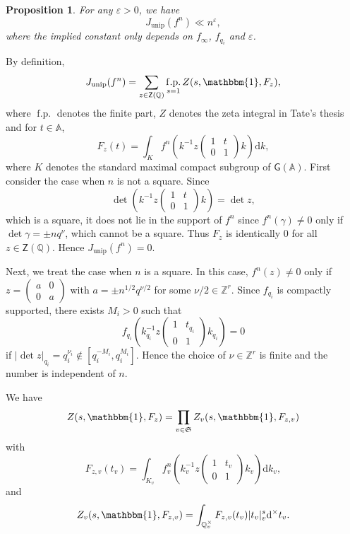\documentclass[10pt,oneside,reqno]{amsart}
\makeatletter
\newcommand\rmd{\mathrm{d}}
\renewcommand\AA{\mathbb{A}}
\newcommand\QQ{\mathbb{Q}}
\newcommand\ZZ{\mathbb{Z}}
\newcommand\mf[1]{\mathfrak{#1}}
\newcommand\G{\mathsf{G}}
\newcommand\Z{\mathsf{Z}}
\newcommand\triv{\mathbbm{1}}
\DeclareMathOperator\fp{f.p.}
\theoremstyle{THEOREM}
\newtheorem{proposition}[theorem]{Proposition}
\theoremstyle{DEFINITION}
\theoremstyle{EXERCISE}
\numberwithin{equation}{section}
\renewenvironment{proof}[1][\proofname]{\par
  \vspace{-6pt}
  \pushQED{\qed}
  \normalfont \topsep6\p@\@plus6\p@\relax
  \trivlist
  \item[\hskip\labelsep\rmfamily\bfseries
    #1\@addpunct{:}]\ignorespaces
}{
  \popQED\endtrivlist\@endpefalse
  \vspace{-6pt}
}
\makeatother
\begin{document}
\begin{proposition}\label{prop:unipestimate}
For any $\varepsilon>0$, we have
\[
J_\mathrm{unip}(f^n)\ll n^\varepsilon,
\]
where the implied constant only depends on $f_\infty$, $f_{q_i}$ and $\varepsilon$.
\end{proposition}
\begin{proof}
By definition, 
\[
J_\mathrm{unip}(f^n)=\sum_{z\in \Z(\QQ)}\fp_{s=1}Z(s,\triv,F_z),
\]
where $\fp$ denotes the finite part, $Z$ denotes the zeta integral in Tate's thesis and for $t\in \AA$,
\[
F_z(t)=\int_{K}f^n\left(k^{-1}z\begin{pmatrix}
                                 1 & t \\
                                 0 & 1 
                               \end{pmatrix}k\right)\rmd k,
\]
where $K$ denotes the standard maximal compact subgroup of $\G(\AA)$. First consider the case when $n$ is not a square.
Since
\[
\det\left(k^{-1}z\begin{pmatrix}
                                 1 & t \\
                                 0 & 1 
                               \end{pmatrix}k\right)=\det z,
\]
which is a square, it does not lie in the support of $f^n$ since $f^n(\gamma)\neq 0$ only if $\det \gamma=\pm nq^\nu$, which cannot be a square. Thus $F_z$ is identically $0$ for all $z\in \Z(\QQ)$. Hence $J_\mathrm{unip}(f^n)=0$.

Next, we treat the case when $n$ is a square. In this case, $f^n(z)\neq 0$ only if $z=(\begin{smallmatrix} a & 0 \\  0 & a \end{smallmatrix})$ with $a=\pm n^{1/2}q^{\nu/2}$ for some $\nu/2\in \ZZ^r$. Since
$f_{q_i}$ is compactly supported, there exists $M_i>0$ such that 
\[
f_{q_i}\left(k_{q_i}^{-1}z\begin{pmatrix}
                                 1 & t_{q_i} \\
                                 0 & 1 
                               \end{pmatrix}k_{q_i}\right)=0
\] 
if $\mathopen{|}\det z\mathopen{|}_{q_i}=q_i^{\nu_i}\notin[q_i^{-M_i},q_i^{M_i}]$. Hence the choice of $\nu\in \ZZ^r$ is finite and the number is independent of $n$.

We have 
\[
Z(s,\triv,F_z)=\prod_{v\in \mf{S}}Z_v(s,\triv,F_{z,v})
\]
with
\[
F_{z,v}(t_v)=\int_{K_v}f_v^n\left(k_v^{-1}z\begin{pmatrix}
                                 1 & t_v \\
                                 0 & 1 
                               \end{pmatrix}k_v\right)\rmd k_v,
\]
and
\[
Z_v(s,\triv,F_{z,v})=\int_{\QQ_v^\times}F_{z,v}(t_v)|t_v|_v^{s}\rmd^\times t_v.
\]


\end{proof}
\end{document}
